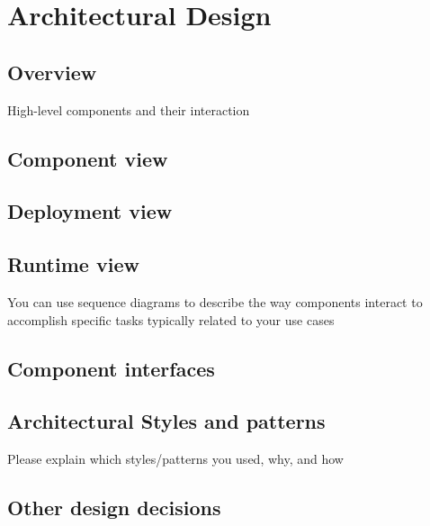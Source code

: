 \section{Architectural Design}
\subsection{Overview}
High-level components and their interaction

\subsection{Component view}
\subsection{Deployment view}
\subsection{Runtime view}
You can use sequence diagrams to describe the way components interact
to accomplish specific tasks typically related to your use cases
\subsection{Component interfaces}
\subsection{Architectural Styles and patterns}
Please explain which styles/patterns you used, why, and how
\subsection{Other design decisions}